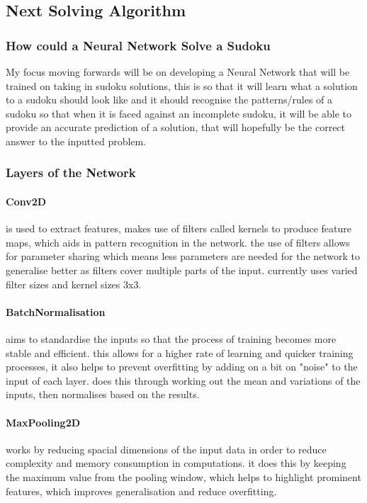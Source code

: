 \documentclass[]{final_report}
\begin{document}
\subsection*{Next Solving Algorithm} 

\subsubsection{How could a Neural Network Solve a Sudoku} 

My focus moving forwards will be on developing a Neural Network that will be trained on taking in sudoku solutions, this is so that it will learn what a solution to a sudoku should look like and it should recognise the patterns/rules of a sudoku so that when it is faced against an incomplete sudoku, it will be able to provide an accurate prediction of a solution, that will hopefully be the correct answer to the inputted problem.

\subsubsection{Layers of the Network}

\paragraph{Conv2D} 
is used to extract features, makes use of filters called kernels to produce feature maps, which aids in pattern recognition in the network. the use of filters allows for parameter sharing which means less parameters are needed for the network to generalise better as filters cover multiple parts of the input. currently uses varied filter sizes and kernel sizes 3x3.

\paragraph{BatchNormalisation}
aims to standardise the inputs so that the process of training becomes more stable and efficient. this allows for a higher rate of learning and quicker training processes, it also helps to prevent overfitting by adding on a bit on "noise" to the input of each layer. does this through working out the mean and variations of the inputs, then normalises based on the results.

\paragraph{MaxPooling2D} 
works by reducing spacial dimensions of the input data in order to reduce complexity and memory consumption in computations. it does this by keeping the maximum value from the pooling window, which helps to highlight prominent features, which improves generalisation and reduce overfitting.
\end{document}
